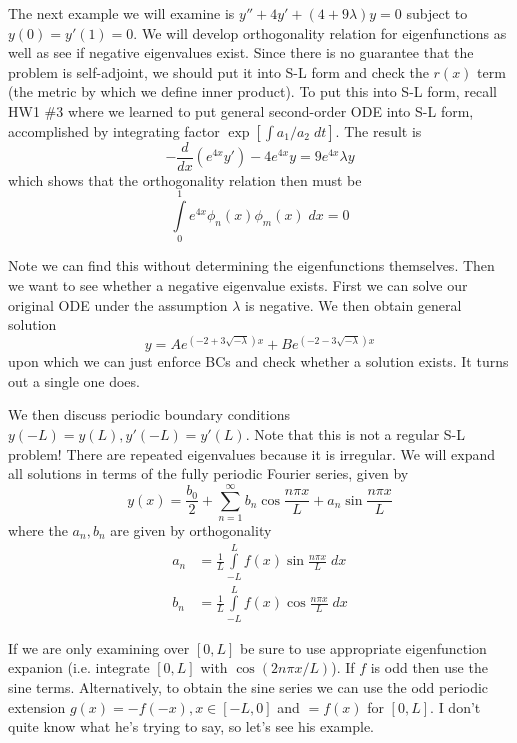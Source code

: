 \documentclass[10pt]{report}
\newcommand{\rd}[2]{\frac{d#1}{d#2}}
\begin{document}
The next example we will examine is $y'' + 4y' + (4 + 9\lambda)y = 0$ subject to $y(0) = y'(1) = 0$. We will develop orthogonality relation for eigenfunctions as well as see if negative eigenvalues exist. Since there is no guarantee that the problem is self-adjoint, we should put it into S-L form and check the $r(x)$ term (the metric by which we define inner product). To put this into S-L form, recall HW1 \#3 where we learned to put general second-order ODE into S-L form, accomplished by integrating factor $\exp[\int a_1/a_2 \;dt]$. The result is
\begin{equation}
    -\rd{}{x}\left( e^{4x}y' \right) - 4e^{4x}y = 9e^{4x}\lambda y
\end{equation}
which shows that the orthogonality relation then must be
\begin{equation}
    \displaystyle\int\limits_{0}^{1}e^{4x}\phi_n(x)\phi_m(x)\;dx = 0
\end{equation}

Note we can find this without determining the eigenfunctions themselves. Then we want to see whether a negative eigenvalue exists. First we can solve our original ODE under the assumption $\lambda$ is negative. We then obtain general solution
\begin{equation}
    y = Ae^{(-2 + 3\sqrt{-\lambda})x} + Be^{(-2 - 3\sqrt{-\lambda})x}
\end{equation}
upon which we can just enforce BCs and check whether a solution exists. It turns out a single one does.

We then discuss periodic boundary conditions $y(-L) = y(L), y'(-L) = y'(L)$. Note that this is not a regular S-L problem! There are repeated eigenvalues because it is irregular. We will expand all solutions in terms of the fully periodic Fourier series, given by
\begin{equation}
    y(x) = \frac{b_0}{2} + \sum_{n=1}^{\infty}b_n\cos\frac{n\pi x}{L} + a_n\sin\frac{n\pi x}{L}
\end{equation}
where the $a_n, b_n$ are given by orthogonality
\begin{align}
    a_n &= \frac{1}{L}\displaystyle\int\limits_{-L}^{L}f(x)\sin \frac{n\pi x}{L}\;dx\\
    b_n &= \frac{1}{L}\displaystyle\int\limits_{-L}^{L}f(x)\cos \frac{n\pi x}{L}\;dx
\end{align}

If we are only examining over $[0,L]$ be sure to use appropriate eigenfunction expanion (i.e. integrate $[0,L]$ with $\cos (2n\pi x/L)$). If $f$ is odd then use the sine terms. Alternatively, to obtain the sine series we can use the odd periodic extension $g(x) = -f(-x), x \in [-L,0]$ and $=f(x)$ for $[0,L]$. I don't quite know what he's trying to say, so let's see his example.
\end{document}
